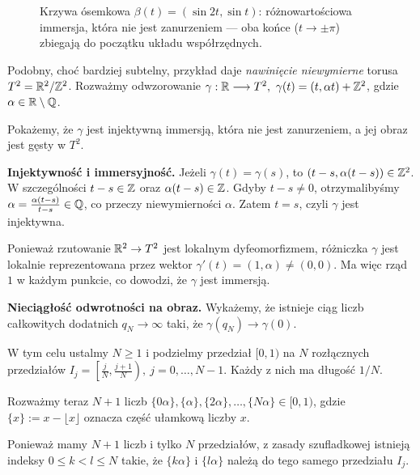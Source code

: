 \begin{figure}[h]
\centering
{}
\caption{Krzywa ósemkowa $\beta(t)=(\sin2t,\sin t)$: różnowartościowa immersja, która nie
jest zanurzeniem — oba końce ($t\to\pm\pi$) zbiegają do początku układu współrzędnych.}
\label{fig:osemka}
\end{figure}


\begin{uwaga}
Podobny, choć bardziej subtelny, przykład daje
\emph{nawinięcie niewymierne} torusa
$T^2=\mathbb{R}^2/\mathbb{Z}^2$. Rozważmy odwzorowanie $\gamma:\mathbb{R}\longrightarrow T^2, \ \gamma(t)=(t,\alpha t)+\mathbb{Z}^2$,
gdzie $\alpha\in\mathbb{R}\setminus\mathbb{Q}$.

Pokażemy, że $\gamma$ jest injektywną immersją,
która nie jest zanurzeniem, a jej obraz
jest gęsty w $T^2$.

\smallskip
\noindent\textbf{Injektywność i immersyjność.}
Jeżeli $\gamma(t)=\gamma(s)$, to $(t-s,\alpha(t-s))\in\mathbb{Z}^2$.
W szczególności $t-s\in\mathbb{Z}$ oraz
$\alpha(t-s)\in\mathbb{Z}$. Gdyby $t-s\ne0$,
otrzymalibyśmy $\alpha=\frac{\alpha(t-s)}{t-s}\in\mathbb{Q}$,
co przeczy niewymierności $\alpha$.
Zatem $t=s$, czyli $\gamma$ jest injektywna.

Ponieważ rzutowanie $\mathbb{R}^2\to T^2$ jest lokalnym
dyfeomorfizmem, różniczka $\gamma$ jest lokalnie
reprezentowana przez wektor $\gamma'(t)=(1,\alpha)\ne(0,0)$.
Ma więc rząd $1$ w każdym punkcie, co dowodzi,
że $\gamma$ jest immersją.

\smallskip
\noindent\textbf{Nieciągłość odwrotności na obraz.}
Wykażemy, że istnieje ciąg liczb całkowitych
dodatnich $q_N\to\infty$ taki, że $\gamma(q_N)\longrightarrow\gamma(0)$.

W tym celu ustalmy $N\ge1$ i podzielmy przedział
$[0,1)$ na $N$ rozłącznych przedziałów $I_j=\left[\frac{j}{N},\frac{j+1}{N}\right), \ j=0,\ldots,N-1$.
Każdy z nich ma długość $1/N$.

Rozważmy teraz $N+1$ liczb $\{0\alpha\},\{\alpha\},\{2\alpha\}, \ldots,\{N\alpha\}\in[0,1)$,
gdzie $\{x\}:=x-\lfloor x\rfloor$ oznacza
część ułamkową liczby $x$.

Ponieważ mamy $N+1$ liczb i tylko $N$
przedziałów, z zasady szufladkowej istnieją
indeksy $0\le k<l\le N$ takie, że
$\{k\alpha\}$ i $\{l\alpha\}$ należą do
tego samego przedziału $I_j$.


\end{uwaga}
